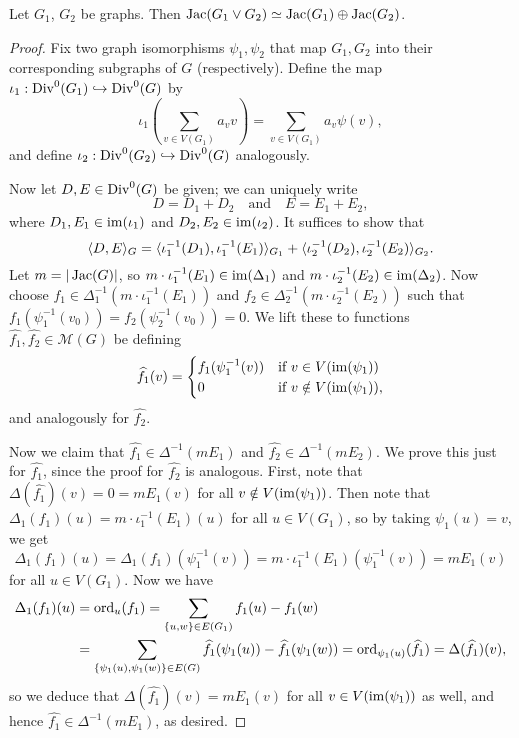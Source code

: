 \documentclass{amsart}
\begin{document}
\begin{prop}
  \label{prop:wedge_sum}
  Let $G_1$, $G_2$ be graphs. Then $\operatorname{Jac}(G_1 \vee G_2) \simeq
  \operatorname{Jac}(G_1) \oplus \operatorname{Jac}(G_2)$. 
\end{prop}
\begin{proof}

  Fix two graph isomorphisms $\psi_1, \psi_2$ that map $G_1, G_2$ into
  their corresponding subgraphs of $G$ (respectively). Define the map
  $\iota_1: \operatorname{Div}^0(G_1) \hookrightarrow \operatorname{Div}^0(G)$ by
  \[
  \iota_1 \left(\sum_{v \in V(G_1)}a_v v \right)= \sum_{v \in
    V(G_1)}a_{v} \psi(v),
  \]
  and define $\iota_2 : \operatorname{Div}^0(G_2) \hookrightarrow \operatorname{Div}^0(G)$
  analogously.

  Now let $D, E \in \operatorname{Div}^0(G)$ be given; we can uniquely write
  \[
  D = D_1 + D_2 \quad \text{and} \quad E = E_1 + E_2,
  \]
  where $D_1, E_1 \in \operatorname{im}(\iota_1)$ and $D_2, E_2 \in
  \operatorname{im}(\iota_2)$. It suffices to show that
  \[
  \langle D, E \rangle_G = \langle \iota_1^{-1}(D_1), \iota_1^{-1}(E_1) \rangle_{G_1} +
  \langle \iota_2^{-1}(D_2), \iota_2^{-1}(E_2) \rangle_{G_2}.
  \]
  Let $m = |\operatorname{Jac}(G)|$, so $m \cdot \iota_1^{-1}(E_1) \in
  \operatorname{im}(\Delta_1)$ and $m \cdot \iota_2^{-1}(E_2) \in
  \operatorname{im}(\Delta_2)$. Now choose $f_1 \in \Delta_1^{-1} (m \cdot
  \iota_1^{-1}(E_1))$ and $f_2 \in \Delta_2^{-1} (m \cdot
  \iota_2^{-1}(E_2))$ such that $f_1(\psi_1^{-1}(v_0)) =
  f_2(\psi_2^{-1}(v_0)) = 0$. We lift these to functions
  $\widehat{f_1}, \widehat{f_2} \in \mathcal{M}(G)$ be defining
  \[
  \widehat{f_1}(v) =
  \begin{cases}
    f_1(\psi_1^{-1}(v)) & \text{if $v \in V(\operatorname{im}(\psi_1))$} \\
    0 & \text{if $v \notin V(\operatorname{im}(\psi_1))$},
  \end{cases}
  \]
  and analogously for $\widehat{f_2}$.

  Now we claim that $\widehat{f_1} \in \Delta^{-1}(mE_1)$ and
  $\widehat{f_2} \in \Delta^{-1}(mE_2)$. We prove this just for
  $\widehat{f_1}$, since the proof for $\widehat{f_2}$ is
  analogous. First, note that $\Delta(\widehat{f_1})(v)=0=mE_1(v)$ for
  all $v \notin V(\operatorname{im}(\psi_1))$. Then note that $\Delta_1(f_1)(u) = m
  \cdot \iota_1^{-1}(E_1)(u)$ for all $u \in V(G_1)$, so by taking
  $\psi_1(u)=v$, we get
  \[
  \Delta_1(f_1)(u) = \Delta_1(f_1)(\psi_1^{-1}(v)) = m \cdot \iota_1^{-1}(E_1)(\psi_1^{-1}(v)) = mE_1(v)
  \]
  for all $u \in V(G_1)$. Now we have
  \begin{align*}
    \Delta_1(f_1)(u) &= \operatorname{ord}_{u}(f_1) = \sum_{\{u,w\} \in E(G_1)} f_1(u) - f_1(w) \\
    &= \sum_{\{\psi_1(u),\psi_1(w)\} \in E(G)}
    \widehat{f_1}(\psi_1(u)) - \widehat{f_1}(\psi_1(w)) =
    \operatorname{ord}_{\psi_1(u)}(\widehat{f_1}) = \Delta(\widehat{f_1})(v),
  \end{align*}
  so we deduce that $\Delta(\widehat{f_1})(v)=mE_1(v)$ for all $v\in
  V(\operatorname{im}(\psi_1))$ as well, and hence
  $\widehat{f_1}\in\Delta^{-1}(mE_1)$, as desired.


\end{proof}
\end{document}
